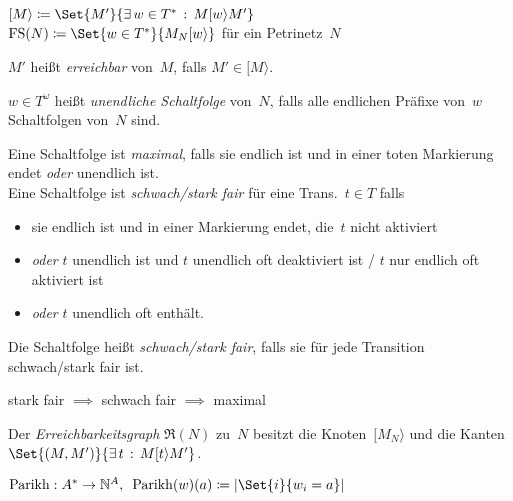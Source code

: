 \documentclass{cheat-sheet}
\newcommand{\activeTransition}[1]{[{#1}\rangle} %
\DeclareMathOperator{\FS}{FS} %
\newcommand{\ReachabilityGraph}{\mathfrak{R}} %
\DeclareMathOperator{\Parikh}{Parikh} %
\begin{document}
\begin{nota}
  \begin{minipage}[t]{0.8 \linewidth}
    $\activeTransition{M} \coloneqq \Set{M'}{\ex{w \in T^{*}} M \activeTransition{w} M'}$ \\
    $\FS(N) \coloneqq \Set{w \in T^{*}}{M_N \activeTransition{w}}$ \enspace
    für ein Petrinetz~$N$
  \end{minipage}
\end{nota}

\begin{defn}
  $M'$ heißt \emph{erreichbar} von~$M$, falls $M' \in \activeTransition{M}$.
\end{defn}

\begin{defn}
  $w \in T^\omega$ heißt \emph{unendliche Schaltfolge} von~$N$, falls alle endlichen Präfixe von~$w$ Schaltfolgen von~$N$ sind.
\end{defn}

\begin{defn}
  Eine Schaltfolge ist \emph{maximal}, falls sie endlich ist und in einer toten Markierung endet \textit{oder} unendlich ist. \\
  Eine Schaltfolge ist \emph{schwach/stark fair} für eine Trans.~$t \in T$ falls
  \begin{itemize}
    \item sie endlich ist und in einer Markierung endet, die~$t$ nicht aktiviert
    \item \textit{oder} $t$ unendlich ist und $t$ unendlich oft deaktiviert ist / $t$ nur endlich oft aktiviert ist
    \item \textit{oder} $t$ unendlich oft enthält.
  \end{itemize}
  Die Schaltfolge heißt \textit{schwach/stark fair}, falls sie für jede Transition schwach/stark fair ist.
\end{defn}

\begin{bem}
  stark fair $\implies$ schwach fair $\implies$ maximal
\end{bem}

\begin{defn}
  Der \emph{Erreichbarkeitsgraph} $\ReachabilityGraph(N)$ zu~$N$ besitzt die Knoten~$\activeTransition{M_N}$ und die Kanten $\Set{(M, M')}{\ex{t} M \activeTransition{t} M'}$.
\end{defn}

\begin{defn}
  $\Parikh : A^{*} \to \N^A, \enspace \Parikh(w)(a) \coloneqq \card{\Set{i}{w_i = a}}$
\end{defn}
\end{document}
